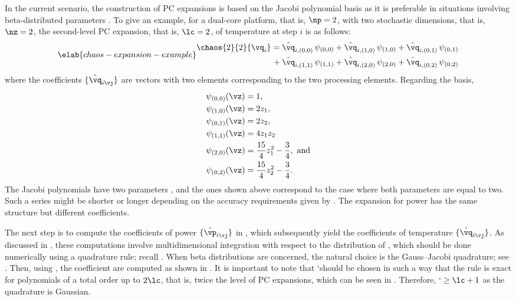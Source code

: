 In the current scenario, the construction of \ac{PC} expansions is based on the
Jacobi polynomial basis as it is preferable in situations involving
beta-distributed parameters \cite{xiu2010}. To give an example, for a dual-core
platform, that is, $\np = 2$, with two stochastic dimensions, that is, $\nz =
2$, the second-level \ac{PC} expansion, that is, $\lc = 2$, of temperature at
step $i$ is as follows:
\begin{equation} \elab{chaos-expansion-example}
  \begin{split}
    \chaos{2}{2}{\vq_i}
    =    {} & \hat{\vq}_{i, (0, 0)} \, \psi_{(0, 0)} +
              \hat{\vq}_{i, (1, 0)} \, \psi_{(1, 0)} +
              \hat{\vq}_{i, (0, 1)} \, \psi_{(0, 1)} \\
    {} + {} & \hat{\vq}_{i, (1, 1)} \, \psi_{(1, 1)} +
              \hat{\vq}_{i, (2, 0)} \, \psi_{(2, 0)} +
              \hat{\vq}_{i, (0, 2)} \, \psi_{(0, 2)}
  \end{split}
\end{equation}
where the coefficients $\{ \hat{\vq}_{i \vj} \}$ are vectors with two elements
corresponding to the two processing elements. Regarding the basis,
\begin{align*}
  & \psi_{(0, 0)}(\vz) = 1, \\
  & \psi_{(1, 0)}(\vz) = 2 z_1, \\
  & \psi_{(0, 1)}(\vz) = 2 z_2, \\
  & \psi_{(1, 1)}(\vz) = 4 z_1 z_2 \\
  & \psi_{(2, 0)}(\vz) = \frac{15}{4} z_1^2 - \frac{3}{4}, \text{ and} \\
  & \psi_{(0, 2)}(\vz) = \frac{15}{4} z_2^2 - \frac{3}{4}.
\end{align*}
The Jacobi polynomials have two parameters \cite{xiu2010}, and the ones shown
above correspond to the case where both parameters are equal to two. Such a
series might be shorter or longer depending on the accuracy requirements given
by \lc. The expansion for power has the same structure but different
coefficients.

The next step is to compute the coefficients of power $\{ \hat{\vp}_{i \vj} \}$
in , which subsequently yield the coefficients of
temperature $\{ \hat{\vq}_{i \vj} \}$. As discussed in ,
these computations involve multidimensional integration with respect to the
distribution of \vz, which should be done numerically using a quadrature rule;
recall . When beta distributions are concerned, the
natural choice is the Gauss--Jacobi quadrature; see .
Then, using , the coefficient are computed as shown
in . It is important to note that \lq should be chosen
in such a way that the rule is exact for polynomials of a total order up to $2
\lc$, that is, twice the level of \ac{PC} expansions, which can be seen in
 \cite{eldred2008}. Therefore, $\lq \geq \lc + 1$ as the
quadrature is Gaussian.

